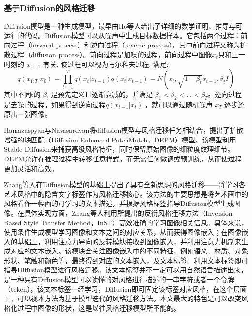 \subsubsection{基于Diffusion的风格迁移}

Diffusion模型是一种生成模型，最早由Ho等人\cite{hoDenoisingDiffusionProbabilistic2020}给出了详细的数学证明、推导与可运行的代码。Diffusion模型可以从噪声中生成目标数据样本。它包括两个过程：前向过程（forward process）和逆向过程（reverse process），其中前向过程又称为扩散过程（diffusion process）。前向过程是加噪的过程，前向过程中图像$ x_t $只和上一时刻的 $x_ {t-1}$ 有关, 该过程可以视为马尔科夫过程, 满足: 
\begin{equation}
    q (x_ {1:T}|x_0) = \prod_ {t = 1}^ {T}q (x_t|x_ {t-1}) q (x_t|x_ {t-1}) = N (x_t, \sqrt {1-\beta_t}x_ {t-1},\beta_t I)
\end{equation} 
其中不同t的 $\beta_t$ 是预先定义且逐渐衰减的，并满足 $\beta_1<\beta_2<...<\beta_T$。逆向过程是去噪的过程，如果得到逆向过程$ q (x_ {t-1}|x_ {t})$ ，就可以通过随机噪声 $x_T$ 逐步还原出一张图像。

Hamazaspyan与Navasardyan\cite{hamazaspyanDiffusionEnhancedPatchMatchFramework2023}将diffusion模型与风格迁移任务相结合，提出了扩散增强的块匹配（Diffusion-Enhanced PatchMatch，DEPM）模型。该模型利用Stable Diffusion来捕获高级风格特征，同时保留原始图像的细粒度纹理细节。DEPM允许在推理过程中转移任意样式，而无需任何微调或预训练，从而使过程更加灵活和高效。

Zhang等人\cite{zhangInversionBasedStyleTransfer2023}在Diffusion模型的基础上提出了具有全新思想的风格迁移——将学习各艺术风格中的隐含文字标签作为风格迁移核心。该方法的主要思想是将艺术画中的风格看作一幅画的可学习的文本描述，并根据风格标签指导Diffusion模型生成图像。在具体实现方面，Zhang等人利用所提出的反衍风格迁移方法（Inversion-Based Style Transfer Method，InST）高效准确的学习图像相关信息。具体来说，使用条件生成模型学习图像和文本之间的对应关系，从而获得图像嵌入；在图像嵌入的基础上，利用注意力导向的反转模块接收到图像嵌入，并利用注意力机制来生成对应的文本嵌入。该模块会关注图像嵌入中的不同特征，例如语义、材质、对象形状、笔触和颜色等，最终得到对应的文本嵌入，及文本标签。利用文本标签即可指导Diffusion模型进行风格迁移。该文本标签并不一定可以用自然语言描述出来，是一种只有Diffusion模型可以读懂的对风格进行描述的一串字符或者一个令牌（token）。该文本标签一经学习，Diffusion即可固定该标签对应风格，在这个层面上，可以视本方法为基于模型迭代的风格迁移方法。本文最大的特色是可以改变风格化过程中图像的形状，这是以往风格迁移模型所不能的。

